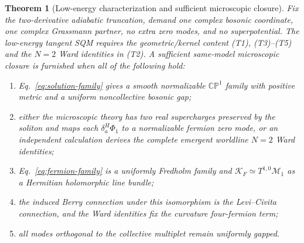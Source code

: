 \documentclass[11pt]{article}
\newtheorem{theorem}{Theorem}[section]
\theoremstyle{definition}
\theoremstyle{remark}
\newcommand{\CP}{\mathbb {CP}}
\newcommand{\cK}{\mathcal K}
\newcommand{\cM}{\mathcal M}
\begin{document}
\begin{theorem}[Low-energy characterization and sufficient microscopic closure]
Fix the two-derivative adiabatic truncation, demand one complex bosonic
coordinate, one complex Grassmann partner, no extra zero modes, and no
superpotential.  The low-energy tangent SQM requires the geometric/kernel
content (T1), (T3)--(T5) and the \(N=2\) Ward identities in (T2).  A sufficient
same-model microscopic closure is furnished when all of the following hold:
\begin{enumerate}[label=(T\arabic*)]
\item Eq.~\eqref{eq:solution-family} gives a smooth normalizable
  \(\CP^1\) family with positive metric and a uniform noncollective bosonic
  gap;
\item either the microscopic theory has two real supercharges preserved by
  the soliton and maps each \(\delta_a^H\Phi_1\) to a normalizable fermion
  zero mode, or an independent calculation derives the complete emergent
  worldline \(N=2\) Ward identities;
\item Eq.~\eqref{eq:fermion-family} is a uniformly Fredholm family and
  \(\cK_F\simeq T^{1,0}\cM_1\) as a Hermitian holomorphic line bundle;
\item the induced Berry connection under this isomorphism is the
  Levi--Civita connection, and the Ward identities fix the curvature
  four-fermion term;
\item all modes orthogonal to the collective multiplet remain uniformly
  gapped.
\end{enumerate}
\end{theorem}
\end{document}
